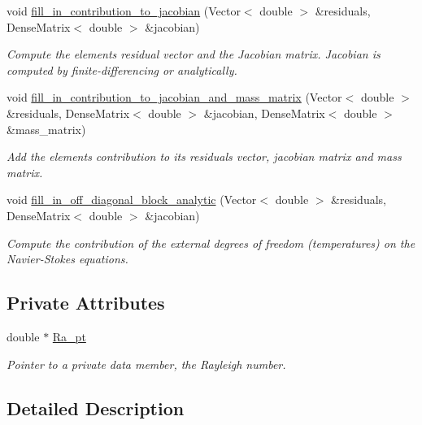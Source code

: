 \begin{DoxyCompactItemize}
void \hyperlink{classoomph_1_1NavierStokesBoussinesqElement_a01483469b070309aeb8948273b974feb}{fill\+\_\+in\+\_\+contribution\+\_\+to\+\_\+jacobian} (Vector$<$ double $>$ \&residuals, Dense\+Matrix$<$ double $>$ \&jacobian)
\begin{DoxyCompactList}\small\item\em Compute the element\textquotesingle{}s residual vector and the Jacobian matrix. Jacobian is computed by finite-\/differencing or analytically. \end{DoxyCompactList}\item 
void \hyperlink{classoomph_1_1NavierStokesBoussinesqElement_a6c6cc7f75f0f9d61574293648bc4f148}{fill\+\_\+in\+\_\+contribution\+\_\+to\+\_\+jacobian\+\_\+and\+\_\+mass\+\_\+matrix} (Vector$<$ double $>$ \&residuals, Dense\+Matrix$<$ double $>$ \&jacobian, Dense\+Matrix$<$ double $>$ \&mass\+\_\+matrix)
\begin{DoxyCompactList}\small\item\em Add the element\textquotesingle{}s contribution to its residuals vector, jacobian matrix and mass matrix. \end{DoxyCompactList}\item 
void \hyperlink{classoomph_1_1NavierStokesBoussinesqElement_a342613c3ceeaf4b5bb86c77dc150372d}{fill\+\_\+in\+\_\+off\+\_\+diagonal\+\_\+block\+\_\+analytic} (Vector$<$ double $>$ \&residuals, Dense\+Matrix$<$ double $>$ \&jacobian)
\begin{DoxyCompactList}\small\item\em Compute the contribution of the external degrees of freedom (temperatures) on the Navier-\/\+Stokes equations. \end{DoxyCompactList}\end{DoxyCompactItemize}
\subsection*{Private Attributes}
\begin{DoxyCompactItemize}
\item 
double $\ast$ \hyperlink{classoomph_1_1NavierStokesBoussinesqElement_a0f1c9b6947324c4d5386b9b68abba2d1}{Ra\+\_\+pt}
\begin{DoxyCompactList}\small\item\em Pointer to a private data member, the Rayleigh number. \end{DoxyCompactList}\end{DoxyCompactItemize}


\subsection{Detailed Description}
